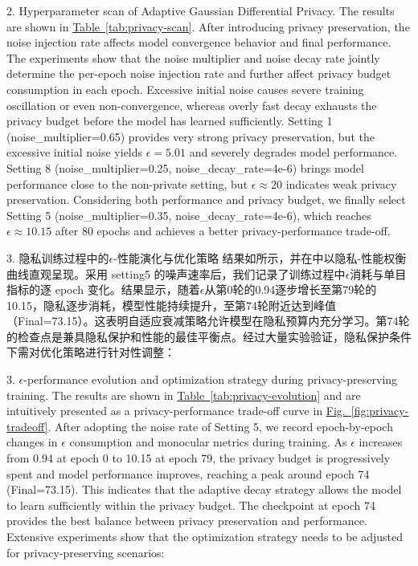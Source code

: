\begin{sloppypar}
2. Hyperparameter scan of Adaptive Gaussian Differential Privacy. The results are shown in \hyperref[tab:privacy-scan]{Table~\ref*{tab:privacy-scan}}. After introducing privacy preservation, the noise injection rate affects model convergence behavior and final performance. The experiments show that the noise multiplier and noise decay rate jointly determine the per-epoch noise injection rate and further affect privacy budget consumption in each epoch. Excessive initial noise causes severe training oscillation or even non-convergence, whereas overly fast decay exhausts the privacy budget before the model has learned sufficiently. Setting 1 (noise\_multiplier=0.65) provides very strong privacy preservation, but the excessive initial noise yields \(\epsilon=5.01\) and severely degrades model performance. Setting 8 (noise\_multiplier=0.25, noise\_decay\_rate=4e\mbox{-}6) brings model performance close to the non-private setting, but \(\epsilon \approx 20\) indicates weak privacy preservation. Considering both performance and privacy budget, we finally select Setting 5 (noise\_multiplier=0.35, noise\_decay\_rate=4e\mbox{-}6), which reaches \(\epsilon \approx 10.15\) after 80 epochs and achieves a better privacy-performance trade-off.
\end{sloppypar}



3. 隐私训练过程中的\(\epsilon\)-性能演化与优化策略 结果如所示，并在中以隐私-性能权衡曲线直观呈现。采用 setting5 的噪声速率后，我们记录了训练过程中\(\epsilon\)消耗与单目指标的逐 epoch 变化。结果显示，随着\(\epsilon\)从第0轮的0.94逐步增长至第79轮的10.15，隐私逐步消耗，模型性能持续提升，至第74轮附近达到峰值（Final=73.15）。这表明自适应衰减策略允许模型在隐私预算内充分学习。第74轮的检查点是兼具隐私保护和性能的最佳平衡点。经过大量实验验证，隐私保护条件下需对优化策略进行针对性调整：

3. \(\epsilon\)-performance evolution and optimization strategy during privacy-preserving training. The results are shown in \hyperref[tab:privacy-evolution]{Table~\ref*{tab:privacy-evolution}} and are intuitively presented as a privacy-performance trade-off curve in \hyperref[fig:privacy-tradeoff]{Fig.~\ref*{fig:privacy-tradeoff}}. After adopting the noise rate of Setting 5, we record epoch-by-epoch changes in \(\epsilon\) consumption and monocular metrics during training. As \(\epsilon\) increases from 0.94 at epoch 0 to 10.15 at epoch 79, the privacy budget is progressively spent and model performance improves, reaching a peak around epoch 74 (Final=73.15). This indicates that the adaptive decay strategy allows the model to learn sufficiently within the privacy budget. The checkpoint at epoch 74 provides the best balance between privacy preservation and performance. Extensive experiments show that the optimization strategy needs to be adjusted for privacy-preserving scenarios:

